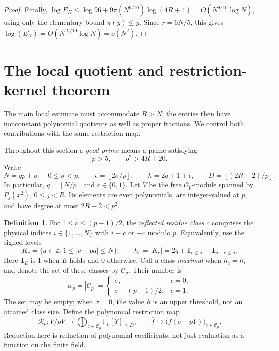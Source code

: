 \documentclass[11pt,letterpaper]{article}
\theoremstyle{definition}
\newtheorem{definition}[definition]{Definition}
\newcommand{\Z}{\mathbb Z}
\newcommand{\Fp}{\mathbb F_p}
\newcommand{\floor}[1]{\left\lfloor #1\right\rfloor}
\begin{document}
\begin{proof}
Finally,
$\log E_N\le\log96+9\pi(N^{9/10})\log(4R+4)
=O(N^{9/10}\log N)$, using only the elementary bound $\pi(y)\le y$.
Since $r=6N/5$, this gives
$\log(E_N^r)=O(N^{19/10}\log N)=o(N^2)$.
\end{proof}


\section{The local quotient and restriction-kernel theorem}\label{sec:local-kernel}

The main local estimate must accommodate $R>N$: the entries then have
nonconstant polynomial quotients as well as proper fractions. We control
both contributions with the same restriction map.

Throughout this section a \emph{good prime} means a prime satisfying
\begin{equation}\label{eq:good-prime}
 p>5,\qquad p^2>4R+20.
\end{equation}
Write
\begin{equation}\label{eq:local-parameters}
 N=qp+\sigma,\quad 0\le\sigma<p,\qquad
 \epsilon=\floor{2\sigma/p},\qquad
 h=2q+1+\epsilon,\qquad D=\floor{(2R-2)/p}.
\end{equation}
In particular, $q=\floor{N/p}$ and $\epsilon\in\{0,1\}$.
Let $V$ be the free $\mathcal O_p$-module spanned by
$P_j(x^2)$, $0\le j<R$. Its elements are even polynomials, are
integer-valued at $p$, and have degree at most $2R-2<p^2$.

\begin{definition}\label{def:restriction-map}
For $1\le c\le(p-1)/2$, the \emph{reflected residue class} $c$ comprises
the physical indices $i\in\{1,\ldots,N\}$ with $i\equiv c$ or $-c$
modulo $p$. Equivalently, use the signed levels
\[
 K_c=\{a\in\Z:1\le |c+pa|\le N\},\qquad
 h_c=|K_c|=2q+\mathbf1_{c\le\sigma}+\mathbf1_{p-c\le\sigma}.
\]
Here $\mathbf1_E$ is $1$ when $E$ holds and $0$ otherwise.
Call a class \emph{maximal} when $h_c=h$, and denote the set of these
classes by $\mathcal C_p$. Their number is
\begin{equation}\label{eq:maximal-class-count}
 w_p=|\mathcal C_p|=
 \begin{cases}
 \sigma,&\epsilon=0,\\
 \sigma-(p-1)/2,&\epsilon=1.
 \end{cases}
\end{equation}
The set may be empty; when $\sigma=0$, the value $h$ is an upper
threshold, not an attained class size. Define the polynomial restriction
map
\begin{equation}\label{eq:restriction-map}
 \mathcal R_p:V/pV\longrightarrow
       \bigoplus_{c\in\mathcal C_p}\Fp[Y]_{\le D},\qquad
 \overline f\longmapsto
       \bigl(\overline{f(c+pY)}\bigr)_{c\in\mathcal C_p}.
\end{equation}
Reduction here is reduction of polynomial coefficients, not just
evaluation as a function on the finite field.
\end{definition}
\end{document}
